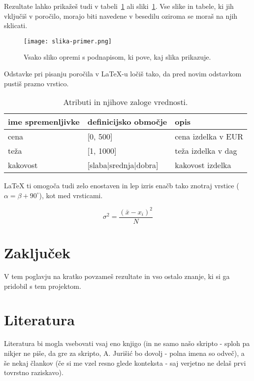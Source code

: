 \documentclass[a4paper,11pt]{article}
\begin{document}
Rezultate lahko prikažeš tudi v tabeli~\ref{tab1} ali sliki~\ref{slika1}. 
Vse slike in tabele, ki jih vključiš v poročilo, morajo biti navedene v 
besedilu oziroma se moraš na njih sklicati.

\begin{figure}[htbp]
\begin{center}
\texttt{[image: slika-primer.png]} %
\caption{Vsako sliko opremi s podnapisom, ki pove, kaj slika prikazuje.}
\label{slika1}
\end{center}
\end{figure}

Odstavke pri pisanju poročila v LaTeX-u ločiš tako, da pred novim
odstavkom pustiš prazno vrstico.
\begin{table}[htbp]
\caption{Atributi in njihove zaloge vrednosti.}
\label{tab1}
\begin{center}
\begin{tabular}{llp{3cm}}
\hline
ime spremenljivke & definicijsko območje & opis \\
\hline
cena & [0, 500] & cena izdelka v EUR\\
teža & [1, 1000] & teža izdelka v dag \\
kakovost & [slaba|srednja|dobra] & kakovost izdelka \\
\hline
\end{tabular}
\end{center}
\end{table}

LaTeX ti omogoča tudi zelo enostaven in lep izris enačb tako znotraj vrstice
($\alpha = \beta + 90^{\circ}$), kot med vrsticami.

$$\sigma^2 = \frac{(\bar{x} - x_i)^2}{N}$$

\section{Zaključek}

V tem poglavju na kratko povzameš rezultate in vso ostalo znanje, ki si ga pridobil
s tem projektom.

\section{Literatura}

Literatura bi mogla vsebovati vsaj eno knjigo (in ne samo našo
skripto - sploh pa nikjer ne piše, da gre za skripto, A. Jurišić bo
dovolj - polna imena so odveč), a še nekaj člankov (če si me vzel
resno glede konteksta - saj verjetno ne delaš prvi tovrstno raziskavo).
\end{document}

